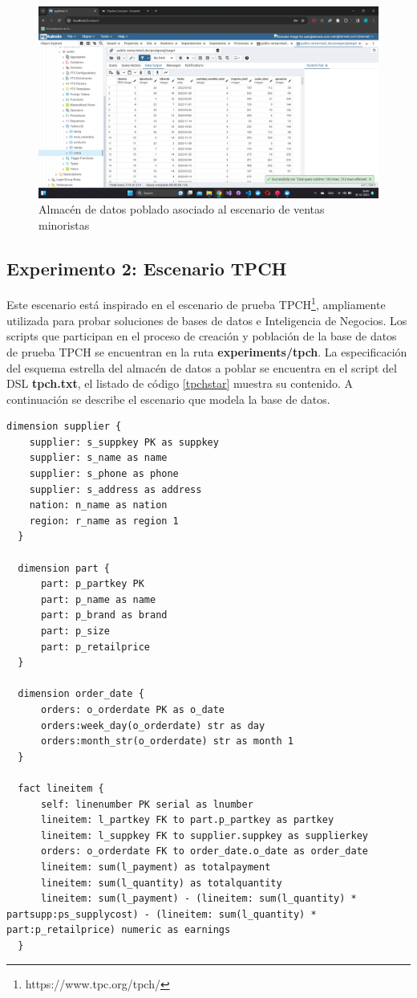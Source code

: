 \begin{figure}
  \centering
  \includegraphics[scale=0.4]{Graphics/fullpgadmin1.png}
  \caption{Almacén de datos poblado asociado al escenario de ventas minoristas}
  \label{fig:fullpg1}
\end{figure}


\subsection{Experimento 2: Escenario TPCH}

Este escenario est\'a inspirado en el escenario de prueba TPCH\footnote{https://www.tpc.org/tpch/}, ampliamente 
utilizada para probar soluciones de bases de datos e Inteligencia de Negocios. Los scripts que participan 
en el proceso de creaci\'on y poblaci\'on de la base de datos de prueba TPCH se encuentran en la ruta 
\textbf{experiments/tpch}. La especificaci\'on del esquema estrella del almacén de datos a poblar se encuentra 
en el script del DSL \textbf{tpch.txt}, el listado de c\'odigo \ref{tpchstar} muestra su contenido.  A continuaci\'on se describe el escenario que modela la base de datos.

\begin{lstlisting}[label={tpchstar}, caption={Definici\'on del esquema estrella del almacén de datos asociado al escenario TPCH}]
  dimension supplier {
    supplier: s_suppkey PK as suppkey
    supplier: s_name as name
    supplier: s_phone as phone
    supplier: s_address as address
    nation: n_name as nation
    region: r_name as region 1
  }

  dimension part {
      part: p_partkey PK
      part: p_name as name
      part: p_brand as brand
      part: p_size
      part: p_retailprice
  }

  dimension order_date {
      orders: o_orderdate PK as o_date
      orders:week_day(o_orderdate) str as day
      orders:month_str(o_orderdate) str as month 1
  }

  fact lineitem {
      self: linenumber PK serial as lnumber
      lineitem: l_partkey FK to part.p_partkey as partkey
      lineitem: l_suppkey FK to supplier.suppkey as supplierkey
      orders: o_orderdate FK to order_date.o_date as order_date
      lineitem: sum(l_payment) as totalpayment
      lineitem: sum(l_quantity) as totalquantity
      lineitem: sum(l_payment) - (lineitem: sum(l_quantity) * partsupp:ps_supplycost) - (lineitem: sum(l_quantity) * part:p_retailprice) numeric as earnings
  }
\end{lstlisting}

